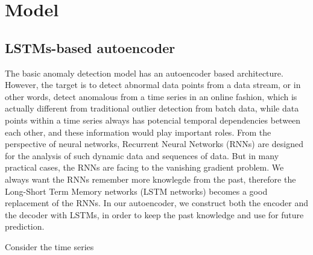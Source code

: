 \chapter{Model}
\label{model}

\section{LSTMs-based autoencoder}
\label{sec:LSTMs-based autoencoder}

The basic anomaly detection model has an autoencoder based architecture. However, the target is to detect abnormal data points from a data stream, or in other words, detect anomalous from a time series in an online fashion, which is actually different from traditional outlier detection from batch data, while data points within a time series always has potencial temporal dependencies between each other, and these information would play important roles. From the perspective of neural networks, Recurrent Neural Networks (RNNs) are designed for the analysis of such dynamic data and sequences of data. But in many practical cases, the RNNs are facing to the vanishing gradient problem. We always want the RNNs remember more knowlegde from the past, therefore the Long-Short Term Memory networks (LSTM networks) becomes a good replacement of the RNNs. In our autoencoder, we construct both the encoder and the decoder with LSTMs, in order to keep the past knowledge and use for future prediction. 

Consider the time series 